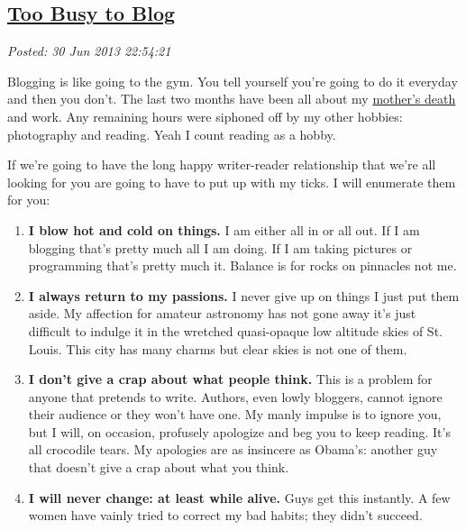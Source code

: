 %

\subsection*{\href{https://bakerjd99.wordpress.com/2013/06/30/too-busy-to-blog/}{Too Busy to Blog}}


\noindent\emph{Posted: 30 Jun 2013 22:54:21}
\vspace{6pt}

Blogging is like going to the gym. You tell yourself you're going to do
it everyday and then you don't. The last two months have been all about
my \href{http://bakerjd99.wordpress.com/2013/05/15/evelyns-eulogy/}{mother's
death} and work. Any remaining hours were siphoned off by my other
hobbies: photography and reading. Yeah I count reading as a hobby.

If we're going to have the long happy writer-reader relationship that
we're all looking for you are going to have to put up with my ticks. I
will enumerate them for you:

\begin{enumerate}
\item
  \textbf{I blow hot and cold on things.} I am either all in or all out.
  If I am blogging that's pretty much all I am doing. If I am taking
  pictures or programming that's pretty much it. Balance is for rocks on
  pinnacles not me.
\item
  \textbf{I always return to my passions.} I never give up on things I
  just put them aside. My affection for amateur astronomy has not gone
  away it's just difficult to indulge it in the wretched quasi-opaque
  low altitude skies of St. Louis. This city has many charms but clear
  skies is not one of them.
\item
  \textbf{I don't give a crap about what people think.} This is a
  problem for anyone that pretends to write. Authors, even lowly
  bloggers, cannot ignore their audience or they won't have one. My
  manly impulse is to ignore you, but I will, on occasion, profusely
  apologize and beg you to keep reading. It's all crocodile tears. My
  apologies are as insincere as Obama's: another guy that doesn't give a
  crap about what you think.
\item
  \textbf{I will never change: at least while alive.} Guys get this
  instantly. A few women have vainly tried to correct my bad habits;
  they didn't succeed.
\end{enumerate}

